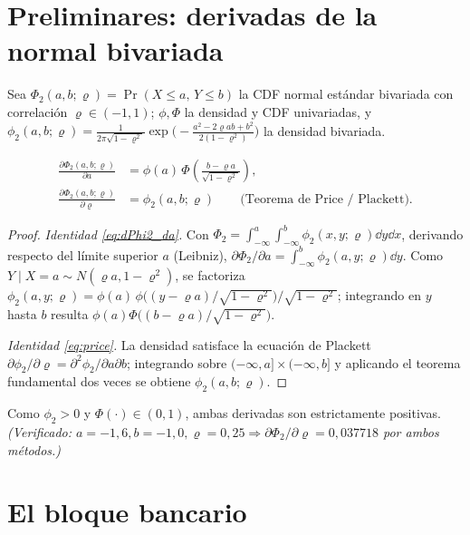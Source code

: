 \section{Preliminares: derivadas de la normal bivariada}\label{sec:prelim}

Sea $\Phi_2(a,b;\varrho)=\Pr(X\le a,\,Y\le b)$ la CDF normal estándar bivariada con correlación $\varrho\in(-1,1)$; $\phi,\Phi$ la densidad y CDF univariadas, y $\phi_2(a,b;\varrho)=\frac{1}{2\pi\sqrt{1-\varrho^2}}\exp\!\big(-\frac{a^2-2\varrho ab+b^2}{2(1-\varrho^2)}\big)$ la densidad bivariada.

\begin{lemma}\label{lem:phi2-A}
\begin{align}
\frac{\partial \Phi_2(a,b;\varrho)}{\partial a} &= \phi(a)\,\Phi\!\left(\frac{b-\varrho a}{\sqrt{1-\varrho^2}}\right), \label{eq:dPhi2_da}\\[4pt]
\frac{\partial \Phi_2(a,b;\varrho)}{\partial \varrho} &= \phi_2(a,b;\varrho) \qquad\text{(Teorema de Price / Plackett).}\label{eq:price}
\end{align}
\end{lemma}

\begin{proof}
\emph{Identidad \eqref{eq:dPhi2_da}.} Con $\Phi_2=\int_{-\infty}^{a}\!\int_{-\infty}^{b}\phi_2(x,y;\varrho)\dd y\dd x$, derivando respecto del límite superior $a$ (Leibniz), $\partial\Phi_2/\partial a=\int_{-\infty}^{b}\phi_2(a,y;\varrho)\dd y$. Como $Y\mid X=a\sim N(\varrho a,1-\varrho^2)$, se factoriza $\phi_2(a,y;\varrho)=\phi(a)\,\phi\!\big((y-\varrho a)/\sqrt{1-\varrho^2}\big)/\sqrt{1-\varrho^2}$; integrando en $y$ hasta $b$ resulta $\phi(a)\Phi\!\big((b-\varrho a)/\sqrt{1-\varrho^2}\big)$.

\emph{Identidad \eqref{eq:price}.} La densidad satisface la ecuación de Plackett $\partial\phi_2/\partial\varrho=\partial^2\phi_2/\partial a\partial b$; integrando sobre $(-\infty,a]\times(-\infty,b]$ y aplicando el teorema fundamental dos veces se obtiene $\phi_2(a,b;\varrho)$.
\end{proof}

\begin{remark}
Como $\phi_2>0$ y $\Phi(\cdot)\in(0,1)$, ambas derivadas son estrictamente positivas. \emph{(Verificado: $a=-1{,}6,b=-1{,}0,\varrho=0{,}25\Rightarrow\partial\Phi_2/\partial\varrho=0{,}037718$ por ambos métodos.)}
\end{remark}

\section{El bloque bancario}

